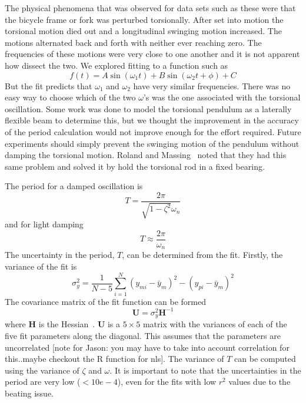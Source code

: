 \documentclass{bmd2010p}
\begin{document}
The physical phenomena that was observed for data sets such as these were that
the bicycle frame or fork was perturbed torsionally. After set into motion the
torsional motion died out and a longitudinal swinging motion increased. The
motions alternated back and forth with neither ever reaching zero. The
frequencies of these motions were very close to one another and it is not
apparent how dissect the two. We explored fitting to a function such as
\begin{equation}
    f(t) = A\sin{(\omega_1 t)} + B\sin{(\omega_2 t + \phi)} + C
    \label{eqn:sumSines}
\end{equation}
But the fit predicts that $\omega_1$ and $\omega_2$ have very similar
frequencies. There was no easy way to choose which of the two $\omega$'s was
the one associated with the torsional oscillation. Some work was done to model
the torsional pendulum as a laterally flexible beam to determine this, but we
thought the improvement in the accuracy of the period calculation would not
improve enough for the effort required. Future experiments should simply
prevent the swinging motion of the pendulum without damping the torsional
motion. Roland and Massing~\cite{Roland1971} noted that they had this same problem and solved it
by hold the torsional rod in a fixed bearing.

The period for a damped oscillation is
\begin{equation}
    T = \frac{2\pi}{\sqrt{1-\zeta^2}\omega_n}
    \label{eqn:periodDamped}
\end{equation}
and for light damping
\begin{equation}
    T \approx \frac{2\pi}{\omega_n}
    \label{eqn:period}
\end{equation}
The uncertainty in the period, $T$, can be determined from the fit. Firstly,
the variance of the fit is
\begin{equation}
    \sigma_y^2 =
    \frac{1}{N-5}\sum_{i=1}^N(y_{mi}-\bar{y}_m)^2-(y_{pi}-\bar{y}_m)^2
    \label{eqn:fitVariance}
\end{equation}
The covariance matrix of the fit function can be formed
\begin{equation}
    \mathbf{U} = \sigma_y^2\mathbf{H}^{-1}
    \label{eqn:covariance}
\end{equation}
where $\mathbf{H}$ is the Hessian~\cite{Hubbard1989b}. $\mathbf{U}$ is a $5\times5$ matrix with the
variances of each of the five fit parameters along the diagonal. This assumes
that the parameters are uncorrelated [note for Jason: you may have to take into
account correlation for this..maybe checkout the R function for nls]. The
variance of $T$ can be computed using the variance of $\zeta$ and $\omega$. It
is important to note that the uncertainties in the period are very low
($<10e-4$), even for the fits with low $r^2$ values due to the beating issue.
\end{document}
